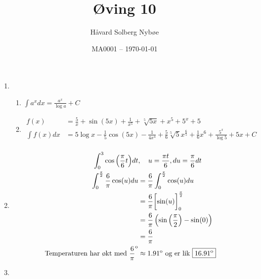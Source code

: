 \documentclass[a4paper, 12pt]{article}  %
\title{Øving 10}                        %
\author{Håvard Solberg Nybøe}           %
\date{MA0001 -- \today}                    %
\begin{document}
\maketitle

\begin{enumerate}
    \item [\boxed{1}]
          \begin{enumerate}
              \item \(\displaystyle \int{a^x}dx = \frac{a^x}{\log a} + C\)
              \item
                    \begin{align*}
                        f(x)          & = \frac{5}{x} + \sin(5x) + \frac{1}{x^5} + \sqrt[5]{5x} + x^5 + 5^x + 5                                                                                \\
                        \int{f(x)} dx & = {5\log x} - {\frac{1}{5}\cos(5x)} - {\frac{1}{4x^4}} + {\frac{5}{6}\sqrt[5]{5}x^{\frac{6}{5}}} + {\frac{1}{6}x^6} + {\frac{5^x}{\log5}} + {5x} + {C} \\
                    \end{align*}
          \end{enumerate}
    \item [\boxed{2}]
          \begin{align*}
              \int_0^3{\cos\left( \frac{\pi}{6}t \right)} dt         & , \quad u = {\pi t \over 6}, du = {\pi\over6}dt                      \\
              \int_0^{\pi\over2}{\frac{6}{\pi}\cos(u)} du            & =\frac{6}{\pi}\int_0^{\pi\over2}{\cos(u)} du                         \\
                                                                     & =\frac{6}{\pi}\biggl[{\sin(u)}\biggr]_0^{\pi\over2}                  \\
                                                                     & = \frac{6}{\pi}\left( \sin\left({\pi\over2}\right) - \sin(0) \right) \\
                                                                     & = \frac{6}{\pi}                                                      \\
              \text{Temperaturen har økt med }\frac{6}{\pi}^\text{o} & \approx 1.91^\text{o} \text{ og er lik } \boxed{16.91^\text{o}}      \\
          \end{align*}
    \item [\boxed{3}]

\end{enumerate}
\end{document}
